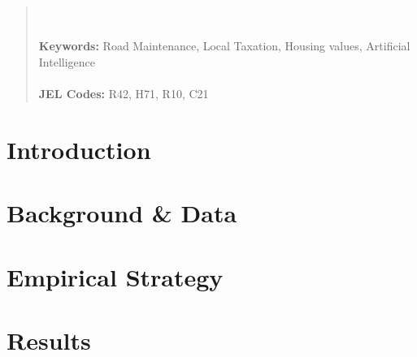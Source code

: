 \documentclass[12pt]{article}
\begin{document}
\begin{titlepage}
\begin{abstract}
\\
\vspace{0in}\\
\noindent\textbf{Keywords:} Road Maintenance, Local Taxation, Housing values, Artificial Intelligence \\
\vspace{0in}\\
\noindent\textbf{JEL Codes:} R42, H71, R10, C21 \\

\bigskip
\end{abstract}
\setcounter{page}{0}
\thispagestyle{empty}
\end{titlepage}
\pagebreak \newpage

\doublespacing

% 

\section{Introduction} \label{sec:introduction}






\section{Background \& Data} \label{sec:data}



\section{Empirical Strategy} \label{sec:empirical}



\section{Results} \label{sec:result}



\end{document}
